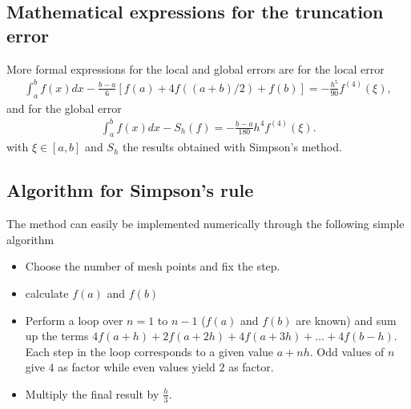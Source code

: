 \documentclass[letterpaper,10pt,english]{sphinxmanual}
\begin{document}
\subsection{Mathematical expressions for the truncation error}
\label{\detokenize{chapter3:mathematical-expressions-for-the-truncation-error}}
More formal expressions for the local and global errors are for the local error
\begin{equation*}
\begin{split}
\int_a^bf(x)dx -\frac{b-a}{6}\left[f(a)+4f((a+b)/2)+f(b)\right]=-\frac{h^5}{90}f^{(4)}(\xi),
\end{split}
\end{equation*}
and for the global error
\begin{equation*}
\begin{split}
\int_a^bf(x)dx -S_h(f)=-\frac{b-a}{180}h^4f^{(4)}(\xi).
\end{split}
\end{equation*}
with \(\xi\in[a,b]\) and \(S_h\) the results obtained with Simpson’s method.




\subsection{Algorithm for Simpson’s rule}
\label{\detokenize{chapter3:algorithm-for-simpson-s-rule}}
The method
can easily be implemented numerically through the following simple algorithm
\begin{itemize}
\item {} 
Choose the number of mesh points and fix the step.

\item {} 
calculate \(f(a)\) and \(f(b)\)

\item {} 
Perform a loop over \(n=1\) to \(n-1\) (\(f(a)\) and \(f(b)\) are known) and sum up   the terms \(4f(a+h) +2f(a+2h)+4f(a+3h)+\dots +4f(b-h)\). Each step in the loop  corresponds to a given value \(a+nh\). Odd values of \(n\) give \(4\) as factor  while even values yield \(2\) as factor.

\item {} 
Multiply the final result by \(\frac{h}{3}\).

\end{itemize}
\end{document}
